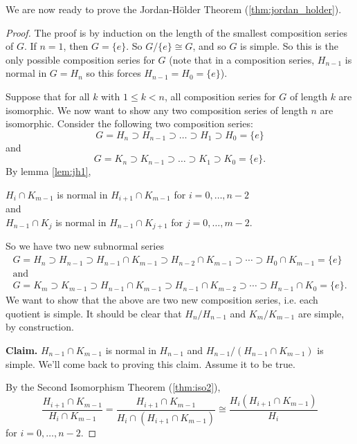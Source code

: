 We are now ready to prove the Jordan-Hölder Theorem (\ref{thm:jordan_holder}).

\begin{proof}
	The proof is by induction on the length of the smallest composition series of $G$. If $n=1$, then $G=\{e\}$. So $G/\{e\}\cong G$, and so $G$ is simple. So this is the only possible composition series for $G$ (note that in a composition series, $H_{n-1}$ is normal in $G=H_n$ so this forces $H_{n-1}=H_0=\{e\}$).

	Suppose that for all $k$ with $1\leq k<n$, all composition series for $G$ of length $k$ are isomorphic. We now want to show any two composition series of length $n$ are isomorphic. Consider the following two composition series:
	\begin{equation}\label{eq:jh_series1}
		G=H_n\supset H_{n-1}\supset\hdots\supset H_1\supset H_0=\{e\}
	\end{equation}
	and
	\begin{equation}\label{eq:jh_series2}
		G=K_n\supset K_{n-1}\supset\hdots\supset K_1\supset K_0=\{e\}.
	\end{equation}
	By lemma \ref{lem:jh1},
	\begin{center}
		$H_i\cap K_{m-1}$ is normal in $H_{i+1}\cap K_{m-1}$ for $i=0,\hdots,n-2$\\
		and\\
		$H_{n-1}\cap K_j$ is normal in $H_{n-1}\cap K_{j+1}$ for $j=0,\hdots,m-2$.
	\end{center}
	So we have two new subnormal series
	\begin{gather*}
		G=H_n\supset H_{n-1}\supset H_{n-1}\cap K_{m-1} \supset H_{n-2}\cap K_{m-1}\supset\cdots\supset H_0\cap K_{m-1}=\{e\}\\
		\text{and}\\
		G=K_m\supset K_{m-1}\supset H_{n-1}\cap K_{m-1} \supset H_{n-1}\cap K_{m-2}\supset\cdots\supset H_{n-1}\cap K_0=\{e\}.
	\end{gather*}
	We want to show that the above are two new composition series, i.e. each quotient is simple. It should be clear that $H_n/H_{n-1}$ and $K_m/K_{m-1}$ are simple, by construction.

	\textbf{Claim.} $H_{n-1}\cap K_{m-1}$ is normal in $H_{n-1}$ and $H_{n-1}/(H_{n-1}\cap K_{m-1})$ is simple. We'll come back to proving this claim. Assume it to be true.

	By the Second Isomorphism Theorem (\ref{thm:iso2}),
	$$\frac{H_{i+1}\cap K_{m-1}}{H_i\cap K_{m-1}}=\frac{H_{i+1}\cap K_{m-1}}{H_i\cap(H_{i+1}\cap K_{m-1})}\cong\frac{H_i(H_{i+1}\cap K_{m-1})}{H_i}$$
	for $i=0,\hdots,n-2$.


\end{proof}
